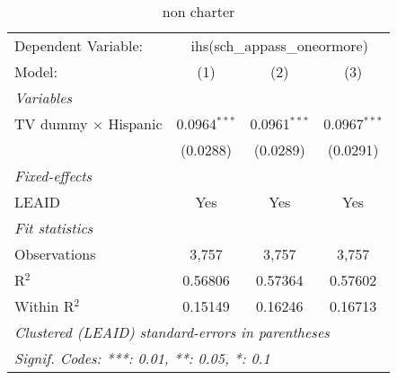 \begin{table}[htbp]
\centering
\caption{non charter}
\begin{tabular}{lccc}
\tabularnewline\midrule\midrule
Dependent Variable:&\multicolumn{3}{c}{ihs(sch\_appass\_oneormore)}\\
Model:&(1) & (2) & (3)\\
\midrule \emph{Variables}&   &   &  \\
TV dummy $\times$ Hispanic & 0.0964$^{***}$ & 0.0961$^{***}$ & 0.0967$^{***}$\\
  &(0.0288) & (0.0289) & (0.0291)\\
\midrule \emph{Fixed-effects}&   &   &  \\
LEAID & Yes & Yes & Yes\\
\midrule \emph{Fit statistics}&  & & \\
Observations & 3,757&3,757&3,757\\
R$^2$ & 0.56806&0.57364&0.57602\\
Within R$^2$ & 0.15149&0.16246&0.16713\\
\midrule\midrule\multicolumn{4}{l}{\emph{Clustered (LEAID) standard-errors in parentheses}}\\
\multicolumn{4}{l}{\emph{Signif. Codes: ***: 0.01, **: 0.05, *: 0.1}}\\
\end{tabular}
\end{table}


